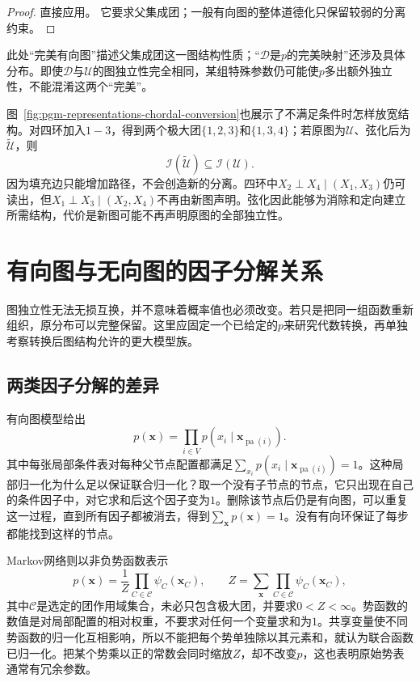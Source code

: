 \begin{proof}
直接应用。
它要求父集成团；一般有向图的整体道德化只保留较弱的分离约束。
\end{proof}

此处“完美有向图”描述父集成团这一图结构性质；“$\mathcal{D}$是$p$的完美映射”还涉及具体分布。即使$\mathcal{D}$与$\mathcal{U}$的图独立性完全相同，某组特殊参数仍可能使$p$多出额外独立性，不能混淆这两个“完美”。

图~\ref{fig:pgm-representations-chordal-conversion}也展示了不满足条件时怎样放宽结构。对四环加入$1-3$，得到两个极大团$\{1,2,3\}$和$\{1,3,4\}$；若原图为$\mathcal{U}$、弦化后为$\widetilde{\mathcal{U}}$，则
\[
  \mathcal{I}(\widetilde{\mathcal{U}})
  \subseteq \mathcal{I}(\mathcal{U}).
\]
因为填充边只能增加路径，不会创造新的分离。四环中$X_2\perp X_4\mid(X_1,X_3)$仍可读出，但$X_1\perp X_3\mid(X_2,X_4)$不再由新图声明。弦化因此能够为消除和定向建立所需结构，代价是新图可能不再声明原图的全部独立性。

\section{有向图与无向图的因子分解关系}
\label{sec:pgm-representations-factorizations}

图独立性无法无损互换，并不意味着概率值也必须改变。若只是把同一组函数重新组织，原分布可以完整保留。这里应固定一个已给定的$p$来研究代数转换，再单独考察转换后图结构允许的更大模型族。

\subsection{两类因子分解的差异}
\label{sec:pgm-representations-normalization}

有向图模型给出
\begin{equation}
  p(\bm{x})=\prod_{i\in V}
  p(x_i\mid\bm{x}_{\operatorname{pa}(i)}).
  \label{eq:pgm-representations-directed-product}
\end{equation}
其中每张局部条件表对每种父节点配置都满足$\sum_{x_i}p(x_i\mid\bm{x}_{\operatorname{pa}(i)})=1$。这种局部归一化为什么足以保证联合归一化？取一个没有子节点的节点，它只出现在自己的条件因子中，对它求和后这个因子变为$1$。删除该节点后仍是有向图，可以重复这一过程，直到所有因子都被消去，得到$\sum_{\bm{x}}p(\bm{x})=1$。没有有向环保证了每步都能找到这样的节点。

Markov网络则以非负势函数表示
\begin{equation}
  p(\bm{x})=\frac{1}{Z}
  \prod_{C\in\mathcal{C}}\psi_C(\bm{x}_C),
  \qquad
  Z=\sum_{\bm{x}}\prod_{C\in\mathcal{C}}\psi_C(\bm{x}_C),
  \label{eq:pgm-representations-undirected-product}
\end{equation}
其中$\mathcal{C}$是选定的团作用域集合，未必只包含极大团，并要求$0<Z<\infty$。势函数的数值是对局部配置的相对权重，不要求对任何一个变量求和为$1$。共享变量使不同势函数的归一化互相影响，所以不能把每个势单独除以其元素和，就认为联合函数已归一化。把某个势乘以正的常数会同时缩放$Z$，却不改变$p$，这也表明原始势表通常有冗余参数。

